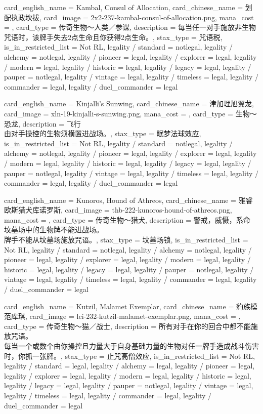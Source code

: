 \documentclass[lang = cn, color = black, 10pt]{AllThatStax}
\begin{document}
\card
{
	card_english_name = {Kambal, Consul of Allocation},
	card_chinese_name = {划配执政坎拔},
	card_image = 2x2-237-kambal-consul-of-allocation.png,
	mana_cost = ,
	card_type = 传奇生物～人类／参谋,
	description = {每当任一对手施放非生物咒语时，该牌手失去2点生命且你获得2点生命。},
	stax_type = 咒语税,
	is_in_restricted_list = Not RL,
	legality / standard = notlegal,
	legality / alchemy = notlegal,
	legality / pioneer = legal,
	legality / explorer = legal,
	legality / modern = legal,
	legality / historic = legal,
	legality / legacy = legal,
	legality / pauper = notlegal,
	legality / vintage = legal,
	legality / timeless = legal,
	legality / commander = legal,
	legality / duel_commander = legal
}

\card
{
	card_english_name = {Kinjalli's Sunwing},
	card_chinese_name = {津加理旭翼龙},
	card_image = xln-19-kinjalli-s-sunwing.png,
	mana_cost = ,
	card_type = 生物～恐龙,
	description = {飞行\\
由对手操控的生物须横置进战场。},
	stax_type = 眠梦法球效应,
	is_in_restricted_list = Not RL,
	legality / standard = notlegal,
	legality / alchemy = notlegal,
	legality / pioneer = legal,
	legality / explorer = legal,
	legality / modern = legal,
	legality / historic = legal,
	legality / legacy = legal,
	legality / pauper = notlegal,
	legality / vintage = legal,
	legality / timeless = legal,
	legality / commander = legal,
	legality / duel_commander = legal
}

\card
{
	card_english_name = {Kunoros, Hound of Athreos},
	card_chinese_name = {雅睿欧斯猎犬库诺罗斯},
	card_image = thb-222-kunoros-hound-of-athreos.png,
	mana_cost = ,
	card_type = 传奇生物～猎犬,
	description = {警戒，威慑，系命\\
坟墓场中的生物牌不能进战场。\\
牌手不能从坟墓场施放咒语。},
	stax_type = 坟墓场锁,
	is_in_restricted_list = Not RL,
	legality / standard = notlegal,
	legality / alchemy = notlegal,
	legality / pioneer = legal,
	legality / explorer = legal,
	legality / modern = legal,
	legality / historic = legal,
	legality / legacy = legal,
	legality / pauper = notlegal,
	legality / vintage = legal,
	legality / timeless = legal,
	legality / commander = legal,
	legality / duel_commander = legal
}

\card
{
	card_english_name = {Kutzil, Malamet Exemplar},
	card_chinese_name = {豹族模范库琪},
	card_image = lci-232-kutzil-malamet-exemplar.png,
	mana_cost = ,
	card_type = 传奇生物～猫／战士,
	description = {所有对手在你的回合中都不能施放咒语。\\
每当一个或数个由你操控且力量大于自身基础力量的生物对任一牌手造成战斗伤害时，你抓一张牌。},
	stax_type = 止咒高僧效应,
	is_in_restricted_list = Not RL,
	legality / standard = legal,
	legality / alchemy = legal,
	legality / pioneer = legal,
	legality / explorer = legal,
	legality / modern = legal,
	legality / historic = legal,
	legality / legacy = legal,
	legality / pauper = notlegal,
	legality / vintage = legal,
	legality / timeless = legal,
	legality / commander = legal,
	legality / duel_commander = legal
}
\end{document}
